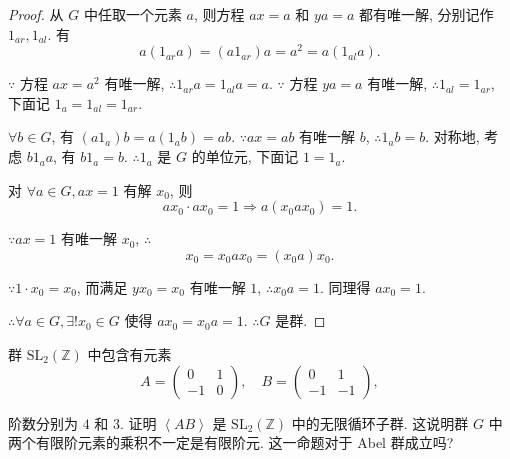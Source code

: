 \documentclass[color=black,device=normal,lang=cn,mode=geye]{elegantnote}
\begin{document}
\begin{proof}
    从 $G$ 中任取一个元素 $a$, 则方程 $ax=a$ 和 $ya=a$ 都有唯一解, 分别记作 $1_{ar},1_{al}$. 有
    \[a(1_{ar}a)=(a1_{ar})a=a^2=a(1_{al}a).\]

    $\because$ 方程 $ax=a^2$ 有唯一解, $\therefore 1_{ar}a=1_{al}a=a$. $\because$ 方程 $ya=a$ 有唯一解, $\therefore 1_{al}=1_{ar}$, 下面记 $1_a=1_{al}=1_{ar}$.

    $\forall b\in G$, 有 $(a1_a)b=a(1_ab)=ab$. $\because ax=ab$ 有唯一解 $b$, $\therefore 1_ab=b$. 对称地, 考虑 $b1_aa$, 有 $b1_a=b$. $\therefore 1_a$ 是 $G$ 的单位元, 下面记 $1=1_a$.

    对 $\forall a\in G,ax=1$ 有解 $x_0$, 则
    \[ax_0\cdot ax_0=1\Rightarrow a(x_0ax_0)=1.\]

    $\because ax=1$ 有唯一解 $x_0$, $\therefore$
    \[x_0=x_0ax_0=(x_0a)x_0.\]

    $\because1\cdot x_0=x_0$, 而满足 $yx_0=x_0$ 有唯一解 $1$, $\therefore x_0a=1$. 同理得 $ax_0=1$.

    $\therefore\forall a\in G,\exists!x_0\in G$ 使得 $ax_0=x_0a=1$. $\therefore G$ 是群.
\end{proof}
\begin{exercise}%
    群 $\mathrm{SL}_2(\mathbb{Z})$ 中包含有元素
    \[A=\begin{pmatrix}
        0 & 1 \\
        -1 & 0
    \end{pmatrix},\quad B=\begin{pmatrix}
        0 & 1 \\
        -1 & -1
    \end{pmatrix},\]

    阶数分别为 $4$ 和 $3$. 证明 $\left<AB\right>$ 是 $\mathrm{SL}_2(\mathbb{Z})$ 中的无限循环子群. 这说明群 $G$ 中两个有限阶元素的乘积不一定是有限阶元. 这一命题对于 Abel 群成立吗?
\end{exercise}
\end{document}
